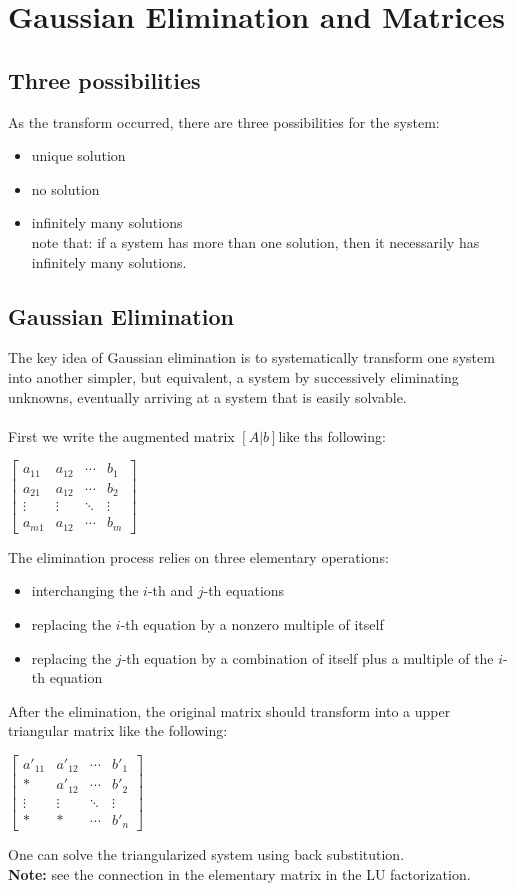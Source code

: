 \documentclass[UTF8,a4paper,11pt]{amsbook}
\begin{document}
\section{Gaussian Elimination and Matrices}
\subsection{Three possibilities}
As the transform occurred, there are three possibilities for the system:
\begin{itemize}
\item{unique solution}
\item{no solution}
\item{infinitely many solutions}
\\note that: if a system has more than one solution, then it necessarily has infinitely many solutions.
\end{itemize}
\subsection{Gaussian Elimination}
The key idea of Gaussian elimination is to systematically transform one system into another simpler, but equivalent, a system by successively eliminating unknowns, eventually arriving at a system that is easily solvable.\\
\\First we write the augmented matrix $[A|b]$like ths following:
\begin{center}
$\left[
\begin{array}{ccc|c}
a_{11} & a_{12} & \cdots & b_{1} \\ 
a_{21} & a_{12} & \cdots & b_{2} \\
\vdots & \vdots & \ddots & \vdots \\
a_{m1} & a_{12} & \cdots & b_{m} 
    \end{array}
\right]$
\end{center}
The elimination process relies on three elementary operations:
\begin{itemize}
\item{interchanging the $i$-th and $j$-th equations}
\item{replacing the $i$-th equation by a nonzero multiple of itself}
\item{replacing the $j$-th equation by a combination of itself plus a multiple
of the $i$-th equation}
\end{itemize}
After the elimination, the original matrix should transform into a upper triangular matrix like the following:
\begin{center}
$\left[
\begin{array}{ccc|c}
a'_{11} & a'_{12} & \cdots & b'_{1} \\ 
* & a'_{12} & \cdots & b'_{2} \\
\vdots & \vdots & \ddots & \vdots \\
* & * & \cdots & b'_{n} 
    \end{array}
\right]$
\end{center}
One can solve the triangularized system using back substitution.\\
\textbf{Note: }see the connection in the elementary matrix in the LU factorization.
\end{document}
